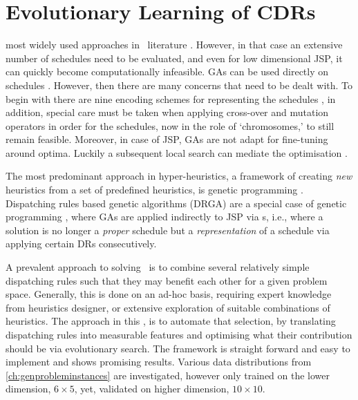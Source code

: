 

\chapter{Evolutionary Learning of CDRs}\label{ch:esmodels} 

 most widely used 
approaches in \JSP\ literature \citep{Pinedo08}. 
However, in that case an extensive number of schedules need to be evaluated, 
and even for low dimensional JSP, it can quickly become computationally 
infeasible. GAs can be used directly on schedules 
\cite{Cheng96,Cheng99,Tsai07,Qing-dao-er-ji12,Ak12}. 
However, then there are many concerns that need to be dealt with. 
To begin with there are nine encoding schemes for representing the schedules 
\cite{Cheng96}, in addition, special care must be taken when applying 
cross-over and mutation operators in order for the schedules, now in the role 
of `chromosomes,' to still remain feasible. 
Moreover, in case of JSP, GAs are not adapt for fine-tuning around optima. 
Luckily a subsequent local search can mediate the optimisation 
\citep{Cheng99,Meeran12}.

The most predominant approach in hyper-heuristics, a framework of creating 
\emph{new} heuristics from a set of  predefined heuristics, is genetic 
programming \cite{Burke10}. Dispatching rules based genetic algorithms (DRGA) 
\cite{Vazquez-Rodriguez09,Dhingra10,Nguyen13} are a special case of genetic 
programming \cite{Koza05}, where GAs are applied indirectly to JSP via 
\dr s, i.e., where a solution is no longer a \emph{proper} schedule 
but a \emph{representation} of a schedule via applying certain DRs 
consecutively. 

A prevalent approach to solving \JSP\ is to combine several relatively simple 
dispatching rules such that they may benefit each other for a given problem 
space. Generally, this is done on an ad-hoc basis, requiring expert knowledge 
from heuristics designer, or extensive exploration of suitable combinations of 
heuristics. The approach in this , is to automate that 
selection, by translating dispatching rules into measurable features and 
optimising what their contribution should be via evolutionary search. The 
framework is straight forward and easy to implement and shows promising 
results. Various data distributions from \cref{ch:genprobleminstances} are 
investigated, however only trained on the lower dimension, $6\times5$, yet, 
validated on higher dimension, $10\times10$. 

